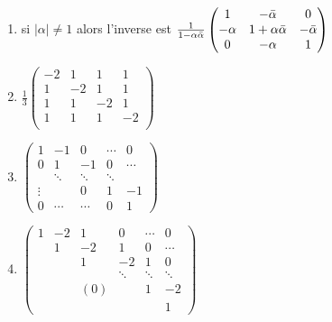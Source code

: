 {{\begin{enumerate}
  \item si $|\alpha|\neq 1$ alors l'inverse est $\frac 1{1-\alpha\bar\alpha}
            \begin{pmatrix} 1       &-\bar\alpha        &0           \cr
                      -\alpha &1+\alpha\bar\alpha &-\bar\alpha \cr
                      0       &-\alpha            &1           \cr\end{pmatrix}$

   \item $\frac13 \begin{pmatrix}
-2 & 1 & 1 & 1 \\ 1 & -2 & 1 & 1 \\ 1 & 1 & -2 & 1 \\ 1 & 1 & 1 & -2 \\
                                      \end{pmatrix}$

  \item $\begin{pmatrix}
1 & -1 & 0 & \cdots & 0 \\
0 & 1 & -1 & 0 & \cdots\\
 & \ddots & \ddots & \ddots &  \\
\vdots & & 0 & 1 & -1  \\
0 & \cdots & \cdots & 0 & 1
\end{pmatrix}$


  \item $\begin{pmatrix}
1 & -2 & 1 & 0 &\cdots & 0 \\
 & 1 & -2 & 1 & 0 & \cdots\\
 &  & 1 & -2 & 1 & 0 \\
 & &  & \ddots & \ddots & \ddots \\
 &  & (0) &  & 1 & -2 \\
 &  &  & &  & 1
\end{pmatrix}$
\end{enumerate}}
}